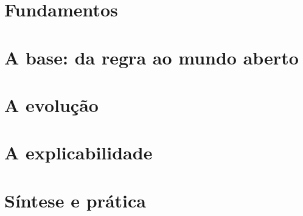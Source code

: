 \documentclass[11pt,a4paper,twoside,openright]{book}
\begin{document}
\mainmatter

\part{Fundamentos}\label{parte:fundamentos}







\part{A base: da regra ao mundo aberto}\label{parte:base}




\part{A evolução}\label{parte:evolucao}




\part{A explicabilidade}\label{parte:explicabilidade}




\part{Síntese e prática}\label{parte:sintese}




\appendix






\backmatter
\cleardoublepage
{}


\cleardoublepage
{}
\printindex

\cleardoublepage
{}
{}

\end{document}
